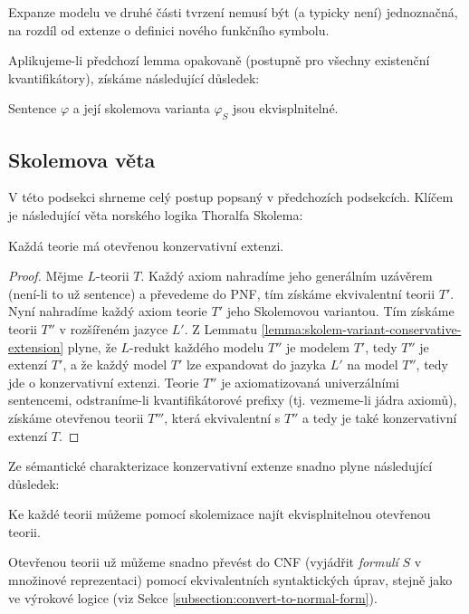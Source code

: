 \begin{remark}
    Expanze modelu ve druhé části tvrzení nemusí být (a typicky není) jednoznačná, na rozdíl od extenze o definici nového funkčního symbolu.
\end{remark}

Aplikujeme-li předchozí lemma opakovaně (postupně pro všechny existenční kvantifikátory), získáme následující důsledek:

\begin{corollary}
    Sentence $\varphi$ a její skolemova varianta $\varphi_S$ jsou ekvisplnitelné.
\end{corollary}


\subsection{Skolemova věta}

V této podsekci shrneme celý postup popsaný v předchozích podsekcích. Klíčem je následující věta norského logika Thoralfa Skolema:

\begin{theorem}
    Každá teorie má otevřenou konzervativní extenzi.
\end{theorem}
\begin{proof}
    Mějme $L$-teorii $T$. Každý axiom nahradíme jeho generálním uzávěrem (není-li to už sentence) a převedeme do PNF, tím získáme ekvivalentní teorii $T'$. Nyní nahradíme každý axiom teorie $T'$ jeho Skolemovou variantou. Tím získáme teorii $T''$ v rozšířeném jazyce $L'$. Z Lemmatu \ref{lemma:skolem-variant-conservative-extension} plyne, že $L$-redukt každého modelu $T''$ je modelem $T'$, tedy $T''$ je extenzí $T'$, a že každý model $T'$ lze expandovat do jazyka $L'$ na model $T''$, tedy jde o konzervativní extenzi. Teorie $T''$ je axiomatizovaná univerzálními sentencemi, odstraníme-li kvantifikátorové prefixy (tj. vezmeme-li jádra axiomů), získáme otevřenou teorii $T'''$, která ekvivalentní s $T''$ a tedy je také konzervativní extenzí $T$.
\end{proof}

Ze sémantické charakterizace konzervativní extenze snadno plyne následující důsledek:

\begin{corollary}
    Ke každé teorii můžeme pomocí skolemizace najít ekvisplnitelnou otevřenou teorii.
\end{corollary}

Otevřenou teorii už můžeme snadno převést do CNF (vyjádřit \emph{formulí} $S$ v množinové reprezentaci) pomocí ekvivalentních syntaktických úprav, stejně jako ve výrokové logice (viz Sekce \ref{subsection:convert-to-normal-form}).


